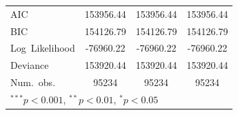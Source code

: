\documentclass[12pt,twoside]{reedthesis}
\begin{document}
\begin{table}
\begin{center}
\begin{footnotesize}
\begin{tabular}{l c c c }
  \hline
  AIC                          & 153956.44              & 153956.44              & 153956.44              \\
  BIC                          & 154126.79              & 154126.79              & 154126.79              \\
  Log\ Likelihood              & -76960.22              & -76960.22              & -76960.22              \\
  Deviance                     & 153920.44              & 153920.44              & 153920.44              \\
  Num.\ obs.                   & 95234                  & 95234                  & 95234                  \\
  \hline
  \multicolumn{4}{l}{\tiny{$^{***}p<0.001$, $^{**}p<0.01$, $^*p<0.05$}}
  \end{tabular}
  \end{footnotesize}
  \label{table:coefficients}
  \end{center}
  \end{table}
  
\end{document}
